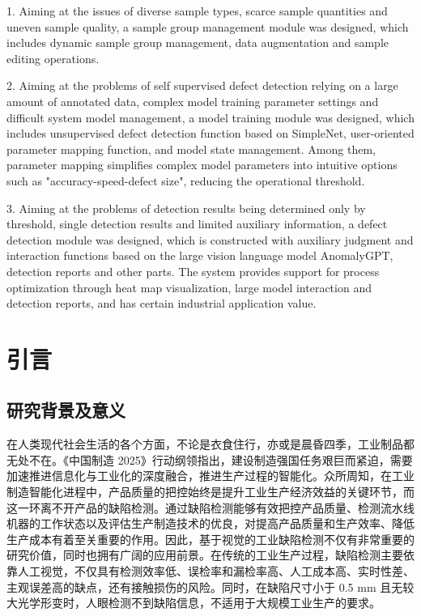 \documentclass[
  ]{njuthesis}
\begin{document}
\begin{abstract*}
1. Aiming at the issues of diverse sample types, scarce sample quantities and uneven sample quality, a sample group management module was designed, which includes dynamic sample group management, data augmentation and sample editing operations.

2. Aiming at the problems of self supervised defect detection relying on a large amount of annotated data, complex model training parameter settings and difficult system model management, a model training module was designed, which includes unsupervised defect detection function based on SimpleNet, user-oriented parameter mapping function, and model state management. Among them, parameter mapping simplifies complex model parameters into intuitive options such as "accuracy-speed-defect size", reducing the operational threshold.

3. Aiming at the problems of detection results being determined only by threshold, single detection results and limited auxiliary information, a defect detection module was designed, which is constructed with auxiliary judgment and interaction functions based on the large vision language model AnomalyGPT, detection reports and other parts. The system provides support for process optimization through heat map visualization, large model interaction and detection reports, and has certain industrial application value.
\end{abstract*}

\tableofcontents
\listoffigures
\listoftables

\mainmatter

\chapter{引言}

\section{研究背景及意义}

在人类现代社会生活的各个方面，不论是衣食住行，亦或是晨昏四季，工业制品都无处不在。《中国制造 2025》行动纲领指出，建设制造强国任务艰巨而紧迫，需要加速推进信息化与工业化的深度融合，推进生产过程的智能化\cite{[1]}。众所周知，在工业制造智能化进程中，产品质量的把控始终是提升工业生产经济效益的关键环节，而这一环离不开产品的缺陷检测。通过缺陷检测能够有效把控产品质量、检测流水线机器的工作状态以及评估生产制造技术的优良，对提高产品质量和生产效率、降低生产成本有着至关重要的作用\cite{[2]}。因此，基于视觉的工业缺陷检测不仅有非常重要的研究价值，同时也拥有广阔的应用前景\cite{[1]}。在传统的工业生产过程，缺陷检测主要依靠人工视觉，不仅具有检测效率低、误检率和漏检率高、人工成本高、实时性差、主观误差高的缺点，还有接触损伤的风险。同时，在缺陷尺寸小于 0.5 mm 且无较大光学形变时，人眼检测不到缺陷信息，不适用于大规模工业生产的要求\cite{[3]}。
\end{document}
